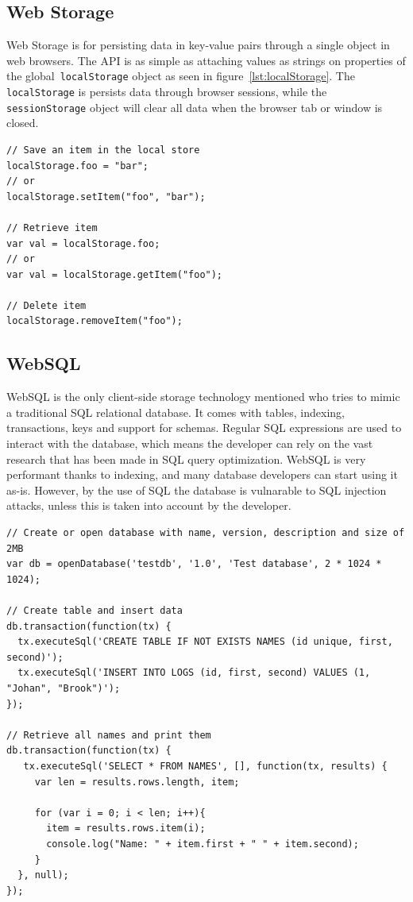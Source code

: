 \subsection{Web Storage}

Web Storage is for persisting data in key-value pairs through a single object in web browsers. The API is as simple as attaching values as strings on properties of the global \texttt{localStorage} object as seen in figure~\ref{lst:localStorage}. The \texttt{localStorage} is persists data through browser sessions, while the \texttt{sessionStorage} object will clear all data when the browser tab or window is closed.

\begin{Code}
\begin{lstlisting}[caption={Use of Web Storage}, label={lst:localStorage}]
// Save an item in the local store
localStorage.foo = "bar";
// or
localStorage.setItem("foo", "bar");

// Retrieve item
var val = localStorage.foo;
// or
var val = localStorage.getItem("foo");

// Delete item
localStorage.removeItem("foo");
\end{lstlisting}
\end{Code}

\subsection{WebSQL}
\label{sec:websql}
WebSQL is the only client-side storage technology mentioned who tries to mimic a traditional SQL relational database. It comes with tables, indexing, transactions, keys and support for schemas. Regular SQL expressions are used to interact with the database, which means the developer can rely on the vast research that has been made in SQL query optimization. WebSQL is very performant thanks to indexing, and many database developers can start using it as-is. However, by the use of SQL the database is vulnarable to SQL injection attacks, unless this is taken into account by the developer.

\begin{Code}
\begin{lstlisting}[caption={Use of WebSQL}, label={lst:websql}]
// Create or open database with name, version, description and size of 2MB
var db = openDatabase('testdb', '1.0', 'Test database', 2 * 1024 * 1024);

// Create table and insert data
db.transaction(function(tx) {
  tx.executeSql('CREATE TABLE IF NOT EXISTS NAMES (id unique, first, second)');
  tx.executeSql('INSERT INTO LOGS (id, first, second) VALUES (1, "Johan", "Brook")');
});

// Retrieve all names and print them
db.transaction(function(tx) {
   tx.executeSql('SELECT * FROM NAMES', [], function(tx, results) {
     var len = results.rows.length, item;

     for (var i = 0; i < len; i++){
       item = results.rows.item(i);
       console.log("Name: " + item.first + " " + item.second);
     }
  }, null);
});
\end{lstlisting}
\end{Code}

